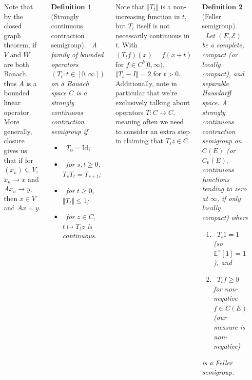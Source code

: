 \documentclass{tikzposter} %
\newcommand{\mc}{\mathcal}
\newcommand\rightopen[2]{\ensuremath{[#1,#2)}}
\newtheorem{definition}{Definition}
\begin{document}
\begin{columns}
{    Note that by the closed graph theorem, if $V$ and $W$ are both Banach, thus $A$ is a bounded linear operator. More generally, closure gives us that if for $(x_n) \subseteq V$, $x_n \to x$ and $Ax_n \to y$, then $x \in V$ and $Ax = y$. \\

    \begin{definition}[Strongly continuous contraction semigroup]
    \ A family of bounded operators $(T_t : t \in [0,\infty])$ on a Banach space $C$ is a strongly continuous contraction semigroup if
    \begin{itemize}[label=$\cdot$]
            \item \ $T_0 = \mathrm{Id}$;
            \item \ for $s, t \ge 0$, $T_s T_t = T_{s+t}$;
            \item \ for $t \ge 0$, $\Vert T_t \Vert \le 1$;
            \item \ for $z \in C$, $t \mapsto T_t z$ is continuous.
    \end{itemize}
    \end{definition}
    \hphantom{}

    Note that $\Vert T_t \Vert$ is a non-increasing function in $t$, but $T_t$ itself is not necessarily continuous in $t$. With $(T_t f)(x) = f(x+t)$ for $f \in C^b\rightopen{0}{\infty}$, $\Vert T_t - I \Vert = 2$ for $t > 0$. Additionally, note in particular that we're exclusively talking about operators $T : C \to C$, meaning often we need to consider an extra step in claiming that $T_t z \in C$. \\

    \begin{definition}[Feller semigroup]
    \ Let $(E, \mc{E})$ be a complete, compact (or locally compact), and separable Hausdorff space. A strongly continuous contraction semigroup on $C(E)$ (or $C_0(E)$, continuous functions tending to zero at $\infty$, if only locally compact) where
    \begin{enumerate}[label=(\roman*), wide=0pt]
            \item \ $T_t 1 = 1$ (so $\mathbb{E}^x [1] = 1$), and
            \item \ $T_t f \ge 0$ for non-negative $f \in C(E)$ (our measure is non-negative)
    \end{enumerate}
    is a Feller semigroup.
    \end{definition}
    \hphantom{}

}
\end{columns}
\end{document}
